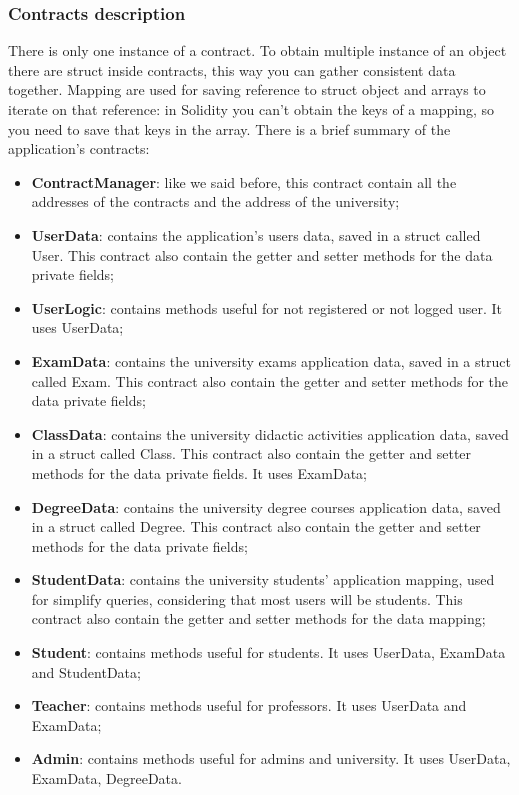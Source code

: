 \subsubsection{Contracts description}
There is only one instance of a contract. To obtain multiple instance of an object there are struct inside contracts, this way you can gather consistent data together. Mapping are used for saving reference to struct object and arrays to iterate on that reference: in Solidity you can't obtain the keys of a mapping, so you need to save that keys in the array.
There is a brief summary of the application's contracts:
\begin{itemize}
	\item \textbf{ContractManager}: like we said before, this contract contain all the addresses of the contracts and the address of the university;
	\item \textbf{UserData}: contains the application's users data, saved in a struct called User. This contract also contain the getter and setter methods for the data private fields;
	\item \textbf{UserLogic}: contains methods useful for not registered or not logged user. It uses UserData;
	\item \textbf{ExamData}: contains the university exams application data, saved in a struct called Exam. This contract also contain the getter and setter methods for the data private fields;
	\item \textbf{ClassData}: contains the university didactic activities application data, saved in a struct called Class. This contract also contain the getter and setter methods for the data  private fields. It uses ExamData;
	\item \textbf{DegreeData}: contains the university degree courses application data, saved in a struct called Degree. This contract also contain the getter and setter methods for the data private fields;
	\item \textbf{StudentData}: contains the university students' application mapping, used for simplify queries, considering that most users will be students. This contract also contain the getter and setter methods for the data mapping;
	\item \textbf{Student}: contains methods useful for students. It uses UserData, ExamData and StudentData;
	\item \textbf{Teacher}: contains methods useful for professors. It uses UserData and ExamData;
	\item \textbf{Admin}: contains methods useful for admins and university. It uses UserData, ExamData, DegreeData.
	
\end{itemize}

